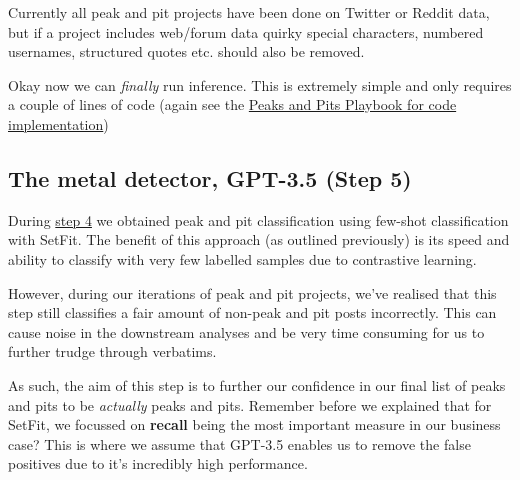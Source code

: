 \documentclass[
  letterpaper,
  DIV=11,
  numbers=noendperiod]{scrreprt}
\begin{document}
\begin{tcolorbox}[enhanced jigsaw, breakable, toprule=.15mm, titlerule=0mm, leftrule=.75mm, opacityback=0, opacitybacktitle=0.6, colbacktitle=quarto-callout-warning-color!10!white, colback=white, bottomrule=.15mm, title=\textcolor{quarto-callout-warning-color}{\faExclamationTriangle}\hspace{0.5em}{Note on social media sources}, coltitle=black, colframe=quarto-callout-warning-color-frame, bottomtitle=1mm, toptitle=1mm, arc=.35mm, rightrule=.15mm, left=2mm]

Currently all peak and pit projects have been done on Twitter or Reddit
data, but if a project includes web/forum data quirky special
characters, numbered usernames, structured quotes etc. should also be
removed.

\end{tcolorbox}

Okay now we can \emph{finally} run inference. This is extremely simple
and only requires a couple of lines of code (again see the
\href{https://jamiehshare.github.io/peaks-pits-bookdown/step-five.html}{Peaks
and Pits Playbook for code implementation})

\subsection{The metal detector, GPT-3.5 (Step 5)}\label{step-five}

During \hyperref[step-four]{step 4} we obtained peak and pit
classification using few-shot classification with SetFit. The benefit of
this approach (as outlined previously) is its speed and ability to
classify with very few labelled samples due to contrastive learning.

However, during our iterations of peak and pit projects, we've realised
that this step still classifies a fair amount of non-peak and pit posts
incorrectly. This can cause noise in the downstream analyses and be very
time consuming for us to further trudge through verbatims.

As such, the aim of this step is to further our confidence in our final
list of peaks and pits to be \emph{actually} peaks and pits. Remember
before we explained that for SetFit, we focussed on \textbf{recall}
being the most important measure in our business case? This is where we
assume that GPT-3.5 enables us to remove the false positives due to it's
incredibly high performance.
\end{document}
